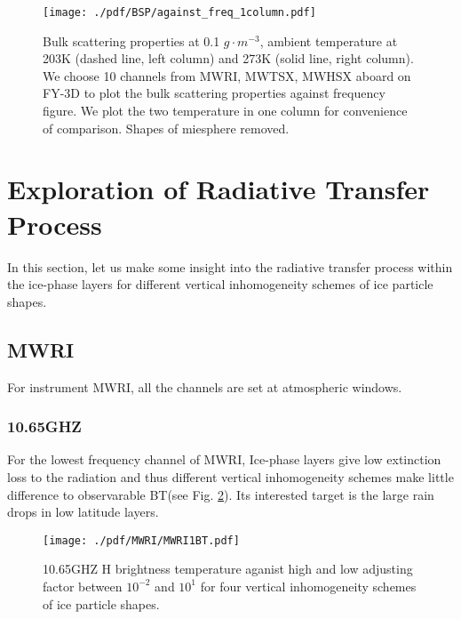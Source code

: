 \begin{figure}[hbtp] 
\centering
\texttt{[image: ./pdf/BSP/against\_freq\_1column.pdf]}
\caption{Bulk scattering properties at 0.1 $g \cdot m^{-3}$, ambient temperature at 203K (dashed line, left column) and 273K (solid line, right column).
We choose 10 channels from MWRI, MWTSX, MWHSX aboard on FY-3D to plot the bulk scattering properties against frequency figure.
We plot the two temperature in one column for convenience of comparison. Shapes of miesphere removed.}
\label{fig:against_freq_1column}
\end{figure}

\clearpage

\section{Exploration of Radiative Transfer Process}

In this section, let us make some insight into the radiative transfer process within the ice-phase layers for 
different vertical inhomogeneity schemes of ice particle shapes.

\subsection{MWRI}
For instrument MWRI, all the channels are set at atmospheric windows.

\subsubsection{10.65GHZ}
For the lowest frequency channel of MWRI, Ice-phase layers give low extinction loss to the radiation and thus different vertical inhomogeneity
schemes make little difference to observarable BT(see Fig. \ref{fig:MWRI1BT}). Its interested target is the large rain drops in low latitude layers.

\begin{figure}[hbtp] 
\centering
\texttt{[image: ./pdf/MWRI/MWRI1BT.pdf]}
\caption{10.65GHZ H brightness temperature aganist high and low adjusting factor between $10^{-2}$ and $10^{1}$ for four vertical 
inhomogeneity schemes of ice particle shapes.}
\label{fig:MWRI1BT}
\end{figure}

